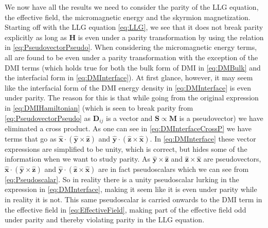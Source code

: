 We now have all the results we need to consider the parity of the LLG equation, the effective field, the micromagnetic energy and the skyrmion magnetization. Starting off with the LLG equation \eqref{eq:LLG}, we see that it does not break parity explicitly as long as $\mathbold{H}$ is even under a parity transformation by using the relation in \eqref{eq:PseudovectorPseudo}. When considering the micromagnetic energy terms, all are found to be even under a parity transformation with the exception of the DMI terms (which holds true for both the bulk form of DMI in \eqref{eq:DMBulk} and the interfacial form in \eqref{eq:DMInterface}). At first glance, however, it may seem like the interfacial form of the DMI energy density in \eqref{eq:DMInterface} is even under parity. The reason for this is that while going from the original expression in \eqref{eq:DMIHamiltonian} (which is seen to break parity from \eqref{eq:PseudovectorPseudo} as $\mathbold{D}_{ij}$ is a vector and $\mathbold{S} \propto \mathbold{M}$ is a pseudovector) we have eliminated a cross product. As one can see in \eqref{eq:DMInterfaceCrossP} we have terms that go as $\mathbold{\hat{x}}\cdot(\mathbold{\hat{y}}\times\mathbold{\hat{z}})$ and $\mathbold{\hat{y}}\cdot(\mathbold{\hat{z}}\times\mathbold{\hat{x}})$. In \eqref{eq:DMInterface} these vector expressions are simplified to be unity, which is correct, but hides some of the information when we want to study parity. As $\mathbold{\hat{y}}\times\mathbold{\hat{z}}$ and $\mathbold{\hat{z}}\times\mathbold{\hat{x}}$ are pseudovectors, $\mathbold{\hat{x}}\cdot(\mathbold{\hat{y}}\times\mathbold{\hat{z}})$ and $\mathbold{\hat{y}}\cdot(\mathbold{\hat{z}}\times\mathbold{\hat{x}})$ are in fact pseudoscalars which we can see from \eqref{eq:Pseudoscalar}. So in reality there is a unity pseudoscalar lurking in the expression in \eqref{eq:DMInterface}, making it seem like it is even under parity while in reality it is not. This same pseudoscalar is carried onwards to the DMI term in the effective field in \eqref{eq:EffectiveField}, making part of the effective field odd under parity and thereby violating parity in the LLG equation.


